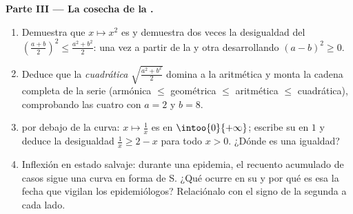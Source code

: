 \begin{problem}
\medskip
\noindent\textbf{Parte III --- La cosecha de la .}
\begin{enumerate}[resume]
  \item Demuestra que $x \mapsto x^2$ es  y demuestra dos veces la
        desigualdad del 
        $\left(\frac{a + b}{2}\right)^2 \leq \frac{a^2 + b^2}{2}$: una vez
        a partir de la  y otra desarrollando
        $(a - b)^2 \geq 0$.
  \item Deduce que la \emph{ cuadrática}
        $\sqrt{\frac{a^2 + b^2}{2}}$ domina a la  aritmética y monta
        la cadena completa de la serie (armónica $\leq$ geométrica $\leq$
        aritmética $\leq$ cuadrática), comprobando las cuatro con $a = 2$ y
        $b = 8$.
  \item {} por debajo de la curva: $x \mapsto \frac1x$ es  en
        $\intoo{0}{+\infty}$; escribe su  en $1$ y deduce la
        desigualdad $\frac1x \geq 2 - x$ para todo $x > 0$. ¿Dónde es una
        igualdad?
  \item Inflexión en estado salvaje: durante una epidemia, el recuento
        acumulado de casos sigue una curva en forma de S. ¿Qué ocurre en su
         y por qué es esa la fecha que vigilan los
        epidemiólogos? Relaciónalo con el signo de la  segunda a
        cada lado.
\end{enumerate}


\end{problem}
